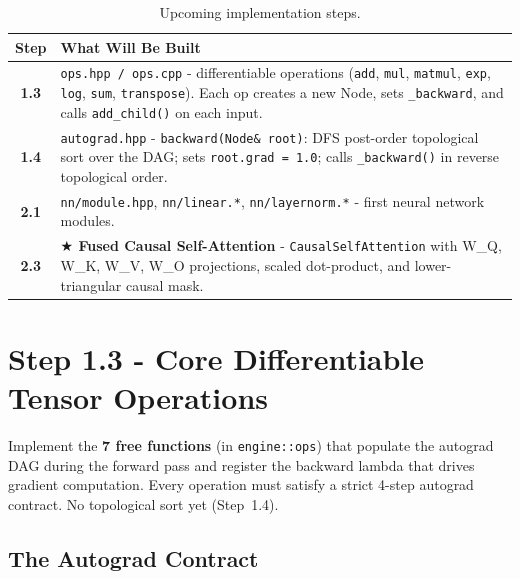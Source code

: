 \documentclass[12pt, a4paper]{article}
\begin{document}
\begin{table}[!ht]
\centering
\renewcommand{\arraystretch}{1.35}
\begin{tabularx}{\textwidth}{@{} c L @{}}
\toprule
\textbf{Step} & \textbf{What Will Be Built} \\
\midrule
\textbf{1.3}
  & \texttt{ops.hpp / ops.cpp} - differentiable operations (\texttt{add},
    \texttt{mul}, \texttt{matmul}, \texttt{exp}, \texttt{log}, \texttt{sum},
    \texttt{transpose}).  Each op creates a new Node, sets \texttt{\_backward},
    and calls \texttt{add\_child()} on each input. \\
\textbf{1.4}
  & \texttt{autograd.hpp} - \texttt{backward(Node\& root)}: DFS post-order
    topological sort over the DAG; sets \texttt{root.grad = 1.0}; calls
    \texttt{\_backward()} in reverse topological order. \\
\textbf{2.1}
  & \texttt{nn/module.hpp}, \texttt{nn/linear.*}, \texttt{nn/layernorm.*} -
    first neural network modules. \\
\textbf{2.3}
  & \textbf{\(\bigstar\) Fused Causal Self-Attention} -
    \texttt{CausalSelfAttention} with W\_Q, W\_K, W\_V, W\_O projections,
    scaled dot-product, and lower-triangular causal mask. \\
\bottomrule
\end{tabularx}
\caption{Upcoming implementation steps.}
\end{table}

\section{Step 1.3 - Core Differentiable Tensor Operations}

\begin{tcolorbox}[designbox, title={Step 1.3 Goal}]
  Implement the \textbf{7 free functions} (in \texttt{engine::ops}) that
  populate the autograd DAG during the forward pass and register the backward
  lambda that drives gradient computation.  Every operation must satisfy a
  strict 4-step autograd contract.  No topological sort yet (Step~1.4).
\end{tcolorbox}

\subsection{The Autograd Contract}
\end{document}
